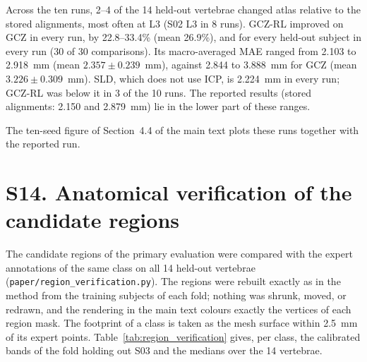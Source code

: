 \documentclass[10pt,a4paper]{article}
\begin{document}
Across the ten runs, 2--4 of the 14 held-out vertebrae changed atlas relative to the stored alignments, most often at L3 (S02 L3 in 8 runs). GCZ-RL improved on GCZ in every run, by 22.8--33.4\% (mean 26.9\%), and for every held-out subject in every run (30 of 30 comparisons). Its macro-averaged MAE ranged from 2.103 to 2.918~mm (mean $2.357\pm0.239$~mm), against 2.844 to 3.888~mm for GCZ (mean $3.226\pm0.309$~mm). SLD, which does not use ICP, is 2.224~mm in every run; GCZ-RL was below it in 3 of the 10 runs. The reported results (stored alignments: 2.150 and 2.879~mm) lie in the lower part of these ranges.

\begin{table}[h]
\centering
\small
\caption{Primary evaluation with the ICP alignments recomputed for ten seed offsets. MAE in mm (macro average over classes); reduction of GCZ-RL relative to GCZ; Pass@5 of GCZ-RL (\%, averaged over vertebra--class cases); GCZ-RL MAE by held-out subject; held-out subjects improved by GCZ-RL over GCZ; held-out vertebrae whose atlas differs from the stored alignments.}
\label{tab:icp_seeds}
\end{table}

The ten-seed figure of Section~4.4 of the main text plots these runs together with the reported run.

\section*{S14. Anatomical verification of the candidate regions}

The candidate regions of the primary evaluation were compared with the expert annotations of the same class on all 14 held-out vertebrae (\texttt{paper/region\_verification.py}). The regions were rebuilt exactly as in the method from the training subjects of each fold; nothing was shrunk, moved, or redrawn, and the rendering in the main text colours exactly the vertices of each region mask. The footprint of a class is taken as the mesh surface within 2.5~mm of its expert points. Table~\ref{tab:region_verification} gives, per class, the calibrated bands of the fold holding out S03 and the medians over the 14 vertebrae.
\end{document}
